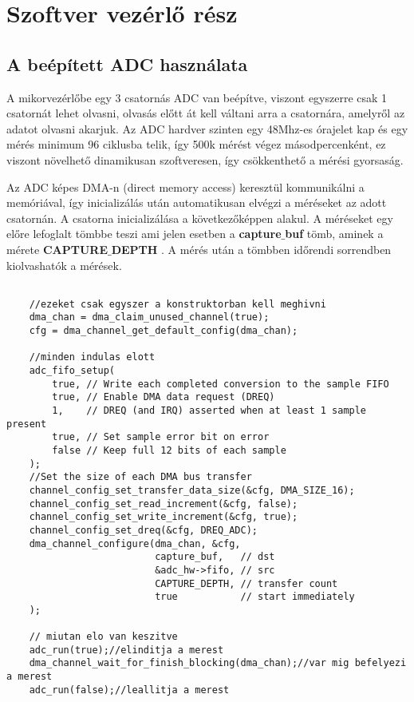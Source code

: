 \section{Szoftver vezérlő rész}

\subsection{A beépített ADC használata}

A mikorvezérlőbe egy 3 csatornás ADC van beépítve, viszont egyszerre csak 1 
csatornát lehet olvasni, olvasás előtt át kell váltani arra a csatornára, amelyről
az adatot olvasni akarjuk. Az ADC hardver szinten egy 48Mhz-es órajelet kap és
egy mérés minimum 96 ciklusba telik, így 500k mérést végez másodpercenként, 
ez viszont növelhető dinamikusan szoftveresen, így csökkenthető a mérési gyorsaság.


Az ADC képes DMA-n (direct memory access) \cite{DMA} keresztül kommunikálni a 
memóriával, így inicializálás után automatikusan elvégzi a méréseket az adott
csatornán. A csatorna inicializálása a következőképpen alakul. A méréseket
egy előre lefoglalt tömbbe teszi ami jelen esetben a \textbf{capture$\_$buf} tömb,
aminek a mérete \textbf{CAPTURE$\_$DEPTH} . A mérés után a tömbben időrendi sorrendben
kiolvashatók a mérések.


\begin{lstlisting}

    //ezeket csak egyszer a konstruktorban kell meghivni
    dma_chan = dma_claim_unused_channel(true);
    cfg = dma_channel_get_default_config(dma_chan);

    //minden indulas elott
    adc_fifo_setup(
        true, // Write each completed conversion to the sample FIFO
        true, // Enable DMA data request (DREQ)
        1,    // DREQ (and IRQ) asserted when at least 1 sample present
        true, // Set sample error bit on error
        false // Keep full 12 bits of each sample
    );
    //Set the size of each DMA bus transfer
    channel_config_set_transfer_data_size(&cfg, DMA_SIZE_16);
    channel_config_set_read_increment(&cfg, false);
    channel_config_set_write_increment(&cfg, true);
    channel_config_set_dreq(&cfg, DREQ_ADC);
    dma_channel_configure(dma_chan, &cfg,
                          capture_buf,   // dst
                          &adc_hw->fifo, // src
                          CAPTURE_DEPTH, // transfer count
                          true           // start immediately
    );

    // miutan elo van keszitve
    adc_run(true);//elinditja a merest
    dma_channel_wait_for_finish_blocking(dma_chan);//var mig befelyezi a merest
    adc_run(false);//leallitja a merest

\end{lstlisting}

